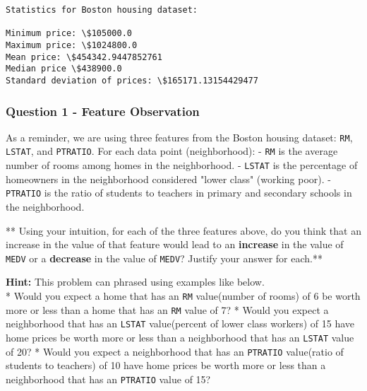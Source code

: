 \documentclass[11pt]{article}
\begin{document}
    \begin{Verbatim}[commandchars=\\\{\}]
Statistics for Boston housing dataset:

Minimum price: \$105000.0
Maximum price: \$1024800.0
Mean price: \$454342.9447852761
Median price \$438900.0
Standard deviation of prices: \$165171.13154429477

    \end{Verbatim}

    \subsubsection{Question 1 - Feature
Observation}\label{question-1---feature-observation}

As a reminder, we are using three features from the Boston housing
dataset: \texttt{\textquotesingle{}RM\textquotesingle{}},
\texttt{\textquotesingle{}LSTAT\textquotesingle{}}, and
\texttt{\textquotesingle{}PTRATIO\textquotesingle{}}. For each data
point (neighborhood): - \texttt{\textquotesingle{}RM\textquotesingle{}}
is the average number of rooms among homes in the neighborhood. -
\texttt{\textquotesingle{}LSTAT\textquotesingle{}} is the percentage of
homeowners in the neighborhood considered "lower class" (working poor).
- \texttt{\textquotesingle{}PTRATIO\textquotesingle{}} is the ratio of
students to teachers in primary and secondary schools in the
neighborhood.

** Using your intuition, for each of the three features above, do you
think that an increase in the value of that feature would lead to an
\textbf{increase} in the value of
\texttt{\textquotesingle{}MEDV\textquotesingle{}} or a \textbf{decrease}
in the value of \texttt{\textquotesingle{}MEDV\textquotesingle{}}?
Justify your answer for each.**

\textbf{Hint:} This problem can phrased using examples like below.\\
* Would you expect a home that has an
\texttt{\textquotesingle{}RM\textquotesingle{}} value(number of rooms)
of 6 be worth more or less than a home that has an
\texttt{\textquotesingle{}RM\textquotesingle{}} value of 7? * Would you
expect a neighborhood that has an
\texttt{\textquotesingle{}LSTAT\textquotesingle{}} value(percent of
lower class workers) of 15 have home prices be worth more or less than a
neighborhood that has an
\texttt{\textquotesingle{}LSTAT\textquotesingle{}} value of 20? * Would
you expect a neighborhood that has an
\texttt{\textquotesingle{}PTRATIO\textquotesingle{}} value(ratio of
students to teachers) of 10 have home prices be worth more or less than
a neighborhood that has an
\texttt{\textquotesingle{}PTRATIO\textquotesingle{}} value of 15?
\end{document}
